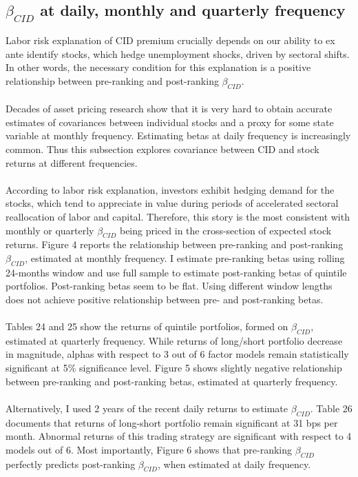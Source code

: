 \documentclass[12pt]{article}
\begin{document}
\subsection{$\beta_{CID}$ at daily, monthly and quarterly frequency}
Labor risk explanation of CID premium crucially depends on our ability to ex ante identify stocks, which hedge unemployment shocks, driven by sectoral shifts. In other words, the necessary condition for this explanation is a positive relationship between pre-ranking and post-ranking $\beta_{CID}$. 
\paragraph{}
Decades of asset pricing research show that it is very hard to obtain accurate estimates of covariances between individual stocks and a proxy for some state variable at monthly frequency. Estimating betas at daily frequency is increasingly common. Thus this subsection explores covariance between CID and stock returns at different frequencies. 
\paragraph{}
According to labor risk explanation, investors exhibit hedging demand for the stocks, which tend to appreciate in value during periods of accelerated sectoral reallocation of labor and capital. Therefore, this story is the most consistent with monthly or quarterly $\beta_{CID}$ being priced in the cross-section of expected stock returns. Figure 4 reports the relationship between pre-ranking and post-ranking $\beta_{CID}$, estimated at monthly frequency. I estimate pre-ranking betas using rolling 24-months window and use full sample to estimate post-ranking betas of quintile portfolios. Post-ranking betas seem to be flat. Using different window lengths does not achieve positive relationship between pre- and post-ranking betas.
\paragraph{}
Tables 24 and 25 show the returns of quintile portfolios, formed on $\beta_{CID}$, estimated at quarterly frequency. While returns of long/short portfolio decrease in magnitude, alphas with respect to 3 out of 6 factor models remain statistically significant at 5\% significance level. Figure 5 shows slightly negative relationship between pre-ranking and post-ranking betas, estimated at quarterly frequency.
\paragraph{}
Alternatively, I used 2 years of the recent daily returns to estimate $\beta_{CID}$. Table 26 documents that returns of long-short portfolio remain significant at 31 bps per month. Abnormal returns of this trading strategy are significant with respect to 4 models out of 6. Most importantly, Figure 6 shows that pre-ranking $\beta_{CID}$ perfectly predicts post-ranking $\beta_{CID}$, when estimated at daily frequency. 
\end{document}
